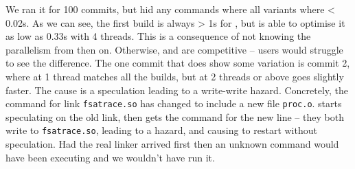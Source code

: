 
We ran it for 100 commits, but hid any commands where all variants where < 0.02s. As we can see, the first build is always > 1s for \Rattle, but \Make is able to optimise it as low as 0.33s with 4 threads. This is a consequence of \Rattle not knowing the parallelism from then on. Otherwise, \Rattle and \Make are competitive -- users would struggle to see the difference. The one commit that does show some variation is commit 2, where \Make at 1 thread matches all the \Rattle builds, but \Make at 2 threads or above goes slightly faster. The cause is a speculation leading to a write-write hazard. Concretely, the command for link \texttt{fsatrace.so} has changed to include a new file \texttt{proc.o}. \Rattle starts speculating on the old link, then gets the command for the new line -- they both write to \texttt{fsatrace.so}, leading to a hazard, and causing \Rattle to restart without speculation. Had the real linker arrived first then an unknown command would have been executing and we wouldn't have run it.


